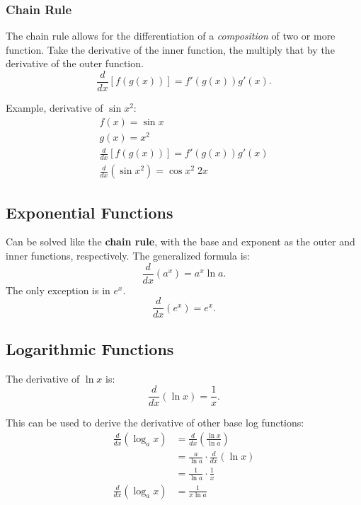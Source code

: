\documentclass[12pt]{article}
\begin{document}
\subsubsection{Chain Rule}
The chain rule allows for the differentiation of a \textit{composition} of two or more function. Take the derivative of the inner function, the multiply that by the derivative of the outer function.
\[ \frac{d}{dx} \left[ f \left( g(x) \right) \right] = f' \left( g(x) \right) g'(x). \]

\noindent Example, derivative of $\sin{x^2}$:
\begin{gather*}
    f(x) = \sin{x} \\
    g(x) = x^2 \\
    \frac{d}{dx} \left[ f \left( g(x) \right) \right] = f' \left( g(x) \right) g'(x) \\
    \frac{d}{dx} \left( \sin{x^2} \right) = \cos{x^2} \; 2x
\end{gather*}

\subsection{Exponential Functions}
Can be solved like the \textbf{chain rule}, with the base and exponent as the outer and inner functions, respectively. The generalized formula is:
\[ \frac{d}{dx} \left( a^x \right) = a^x \ln{a}. \]
The only exception is in $e^x$.
\[ \frac{d}{dx} \left( e^x \right) = e^x.\]

\subsection{Logarithmic Functions}
\noindent The derivative of $\ln{x}$ is:
\[ \frac{d}{dx} \left( \ln{x} \right) = \frac{1}{x}. \]

\noindent This can be used to derive the derivative of other base log functions:
\begin{align*}
    \frac{d}{dx} \left( \log_a{x} \right) & = \frac{d}{dx} \left( \frac{\ln{x}}{\ln{a}} \right)         \\[6pt]
                                          & = \frac{a}{\ln{a}} \cdot \frac{d}{dx} \left( \ln{x} \right) \\[6pt]
                                          & = \frac{1}{\ln{a}} \cdot \frac{1}{x}                        \\[6pt]
    \frac{d}{dx} \left( \log_a{x} \right) & = \frac{1}{x \ln{a}}
\end{align*}
\end{document}
